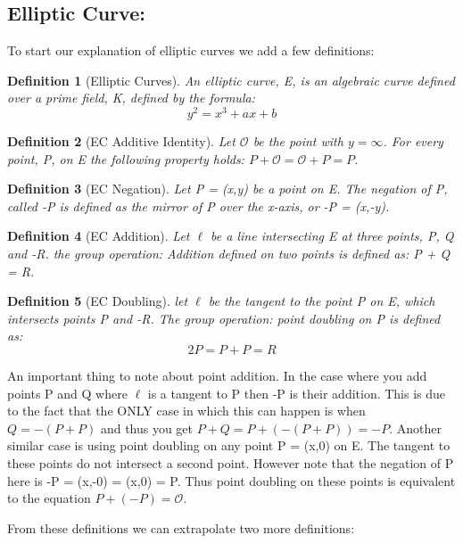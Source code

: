 \documentclass{article}
\newtheorem{definition}{Definition}[section]
\begin{document}
\subsection{Elliptic Curve:}\label{elliptic-curves}

To start our explanation of elliptic curves we add a few definitions:

\begin{definition}[Elliptic Curves]
	An elliptic curve, E, is an algebraic curve defined over a prime field, K, defined by the formula:
	$$y^2 = x^3 + ax + b$$
\end{definition}

\begin{definition}[EC Additive Identity]
	Let $\mathcal{O}$ be the point with $y = \infty$. For every point, P, on E the following property holds: $P + \mathcal{O} = \mathcal{O} + P = P$.
\end{definition}

\begin{definition}[EC Negation]
	Let P = (x,y) be a point on E. The negation of P, called -P is defined as the mirror of P over the x-axis, or -P = (x,-y).
\end{definition}

\begin{definition}[EC Addition]
	Let $\ell$ be a line intersecting E at three points, P, Q and -R. the group operation: Addition defined on two points is defined as: P + Q = R.
\end{definition}

\begin{definition}[EC Doubling]
	let $\ell$ be the tangent to the point P on E, which intersects points P and -R. The group operation: point doubling on P is defined as: $$2P = P + P = R$$
\end{definition}
An important thing to note about point addition. In the case where you add points P and Q where $\ell$ is a tangent to P then -P is their addition. This is due to the fact that the ONLY case in which this can happen is when $Q = -(P + P)$ and thus you get $P + Q = P + (-(P + P)) = -P$. Another similar case is using point doubling on any point P = (x,0) on E. The tangent to these points do not intersect a second point. However note that the negation of P here is -P = (x,-0) = (x,0) = P. Thus point doubling on these points is equivalent to the equation $P + (-P) = \mathcal{O}$.

From these definitions we can extrapolate two more definitions:
\end{document}
